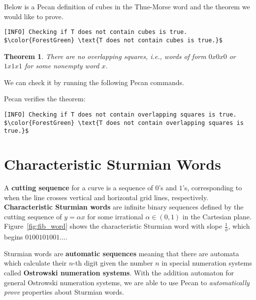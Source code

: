 \documentclass[landscape,usenames,dvipsnames]{sciposter}
\newtheorem{thm}{Theorem}%
\begin{document}
\begin{multicols}{3}
Below is a Pecan definition of cubes in the Thue-Morse word and the theorem we would like to prove.

\begin{lstlisting}[basicstyle=\normalsize\ttfamily, mathescape=true, frame=single]
[INFO] Checking if T does not contain cubes is true.
$\color{ForestGreen} \text{T does not contain cubes is true.}$
\end{lstlisting}

\begin{mdframed}[style=MyFrame]
\begin{thm}
There are no overlapping squares, i.e., words of form $0x0x0$ or $1x1x1$ for some nonempty word $x$.
\end{thm}
\end{mdframed}

We can check it by running the following Pecan commands.

Pecan verifies the theorem:
\begin{lstlisting}[basicstyle=\normalsize\ttfamily, mathescape=true, frame=single]
[INFO] Checking if T does not contain overlapping squares is true.
$\color{ForestGreen} \text{T does not contain overlapping squares is true.}$
\end{lstlisting}

\section*{Characteristic Sturmian Words}
A \textbf{cutting sequence} for a curve is a sequence of $0$'s and $1$'s, corresponding to when the line crosses vertical and horizontal grid lines, respectively.
\textbf{Characteristic Sturmian words} are infinite binary sequences defined by the cutting sequence of $y = \alpha x$ for some irrational $\alpha \in (0,1)$ in the Cartesian plane.
Figure~\ref{fig:fib_word} shows the characteristic Sturmian word with slope $\frac{1}{\phi}$, which begins $0100101001\ldots$.

Sturmian words are \textbf{automatic sequences} meaning that there are automata which calculate their $n$-th digit given the number $n$ in special numeration systems called \textbf{Ostrowski numeration systems}.
With the addition automaton for general Ostrowski numeration systems, we are able to use Pecan to \emph{automatically prove} properties about Sturmian words.


\end{multicols}
\end{document}
